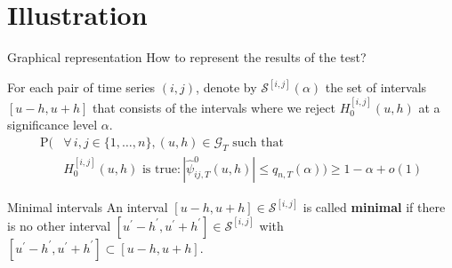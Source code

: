 \documentclass[10pt, handout]{beamer}
\newcommand{\Prob}{\mathrm{P}}
\begin{document}
\section{Illustration}

\begin{frame}{Graphical representation}
How to represent the results of the test? \pause

For each pair of time series $(i, j)$, denote by $\mathcal{S}^{[i, j]}(\alpha)$ the set of intervals $[u-h, u+h]$ that consists of the intervals where we reject $H_0^{[i,j]}(u,h)$ at a significance level $\alpha$.\pause
\begin{align*}\Prob\Big(& \forall \, i,j \in \{1, \ldots, n\}, (u, h) \in \mathcal{G}_T \text{ such that }\\
&H_0^{[i, j]}(u, h) \text{ is true}: |\hat{\psi}^0_{ij,T}(u, h)| \le q_{n,T}(\alpha) \Big) \ge 1 - \alpha + o(1)
\end{align*}
\pause
\vspace{-3mm}
\begin{block}{Minimal intervals}
An interval $[u-h, u+h] \in \mathcal{S}^{[i, j]}$ is called \textbf{minimal} if there is no other interval $[u^\prime-h^\prime, u^\prime+h^\prime] \in  \mathcal{S}^{[i, j]}$ with $[u^\prime-h^\prime, u^\prime+h^\prime] \subset [u-h, u+h]$.
\end{block}
\end{frame}

%
%
\end{document}

